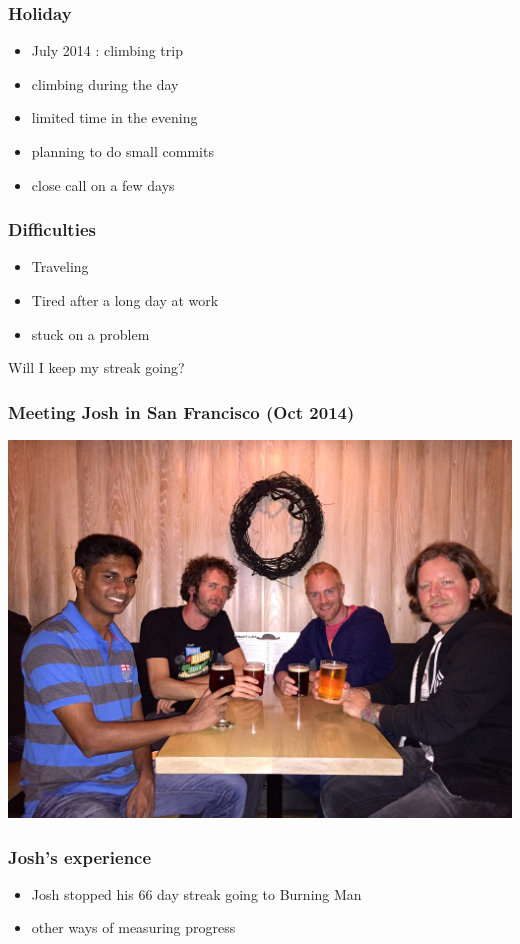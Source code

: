 \documentclass[14pt]{beamer}
\begin{document}
  \begin{frame}
    \frametitle{Holiday}
    \begin{itemize}
      \item July 2014 : climbing trip
      \item climbing during the day
      \item limited time in the evening
      \item planning to do small commits
      \item close call on a few days
    \end{itemize}
  \end{frame}
  \begin{frame}
    \frametitle{Difficulties}
    \begin{itemize}
      \item Traveling
      \item Tired after a long day at work
      \item stuck on a problem
    \end{itemize}
    Will I keep my streak going?
  \end{frame}
  \begin{frame}
    \frametitle{Meeting Josh in San Francisco (Oct 2014)}
    \includegraphics[scale=.1]{josh_justin.jpg}
  \end{frame}
  \begin{frame}
    \frametitle{Josh's experience}
    \begin{itemize}
      \item Josh stopped his 66 day streak going to Burning Man
      \item other ways of measuring progress
    \end{itemize}
  \end{frame}
\end{document}
